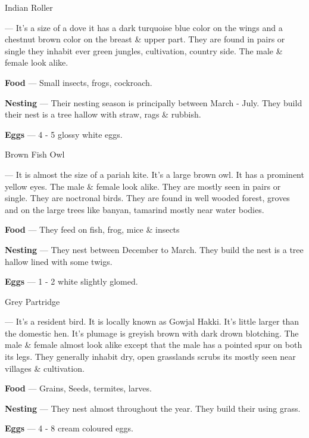 \begin{bird}{Indian Roller}

 --- It's a size of a dove it has a dark turquoise blue color on the wings and a chestnut brown color on the breast \& upper part. They are found in pairs or single they inhabit ever green jungles, cultivation, country side. The male \& female look alike. 

{\large\bf Food} --- Small insects, frogs, cockroach.

{\large\bf Nesting} --- Their nesting season is principally between March - July. They build their nest is a tree hallow with straw, rags \& rubbish.

{\large\bf Eggs} --- 4 - 5 glossy white eggs. 
\end{bird}

\begin{bird}{Brown Fish Owl}

 --- It is almost the size of a pariah kite. It's a large brown owl. It has a prominent yellow eyes. The male \& female look alike. They are mostly seen in pairs or single. They are noctronal birds. They are found in well wooded  forest, groves and on the large trees like banyan, tamarind mostly near water bodies.

{\large\bf Food} --- They feed on fish, frog, mice \& insects

{\large\bf Nesting} --- They nest between December to March. They build the nest is a tree hallow lined with some twigs.

{\large\bf Eggs} --- 1 - 2 white slightly glomed.
\end{bird}

\begin{bird}{Grey Partridge}

 --- It's a resident bird. It is locally known as Gowjal Hakki. It's little larger than the domestic hen. It's plumage is greyish brown with dark drown blotching. The male \& female almost look alike except that the male has a pointed spur on both its legs. They generally inhabit dry, open grasslands scrubs its mostly seen near villages \& cultivation.

{\large\bf Food} --- Grains, Seeds, termites, larves.

{\large\bf Nesting} --- They nest almost throughout the year. They build their using grass.

{\large\bf Eggs} --- 4 - 8 cream coloured eggs.
\end{bird}

